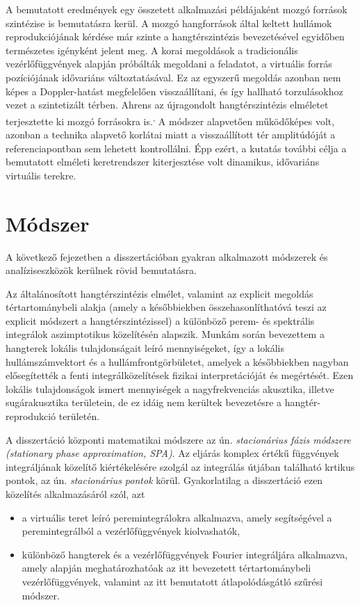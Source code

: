 \documentclass[10pt,twoside]{article}
\theoremstyle{thesisgroupstyle}
\theoremstyle{indented}
\begin{document}
A bemutatott eredmények egy összetett alkalmazási példájaként mozgó források szintézise is bemutatásra kerül.
A mozgó hangforrások által keltett hullámok reprodukciójának kérdése már szinte a hangtérszintézis bevezetésével egyidőben természetes igényként jelent meg.
A korai megoldások a tradicionális vezérlőfüggvények alapján próbálták megoldani a feladatot, a virtuális forrás pozíciójának idővariáns változtatásával.
Ez az egyszerű megoldás azonban nem képes a Doppler-hatást megfelelően visszaállítani, és így hallható torzulásokhoz vezet a szintetizált térben.
Ahrens az újragondolt hangtérszintézis elméletet terjesztette ki mozgó forrásokra is.\textsuperscript{,}
A módszer alapvetően működőképes volt, azonban a technika alapvető korlátai miatt a visszaállított tér amplitúdóját a referenciapontban sem lehetett kontrollálni.
Épp ezért, a kutatás további célja a bemutatott elméleti keretrendszer kiterjesztése volt dinamikus, idővariáns virtuális terekre.

\section{Módszer}

A következő fejezetben a disszertációban gyakran alkalmazott módszerek és analíziseszközök kerülnek rövid bemutatásra.

Az általánosított hangtérszintézis elmélet, valamint az explicit megoldás tértartománybeli alakja (amely a későbbiekben összehasonlíthatóvá teszi az explicit módszert a hangtérszintézissel) a különböző perem- és spektrális integrálok aszimptotikus közelítésén alapszik.
Munkám során bevezettem a hangterek lokális tulajdonságait leíró mennyiségeket, így a lokális hullámszámvektort és a hullámfrontgörbületet, amelyek a későbbiekben nagyban elősegítették a fenti integrálközelítések fizikai interpretációját és megértését.
Ezen lokális tulajdonságok ismert mennyiségek a nagyfrekvenciás akusztika, illetve sugárakusztika területein, de ez idáig nem kerültek bevezetésre a hangtér-reprodukció területén.

A disszertáció központi matematikai módszere az ún. \emph{stacionárius fázis módszere (stationary phase approximation, SPA)}.
Az eljárás komplex értékű függvények integráljának közelítő kiértékelésére szolgál az integrálás útjában található krtikus pontok, az ún. \emph{stacionárius pontok} körül.
Gyakorlatilag a disszertáció ezen közelítés alkalmazásáról szól, azt 
\begin{itemize}
\item a virtuális teret leíró peremintegrálokra alkalmazva, amely segítségével a peremintegrálból a vezérlőfüggvények kiolvashatók,
\item különböző hangterek és a vezérlőfüggvények Fourier integráljára alkalmazva, amely alapján meghatározhatóak az itt bevezetett tértartománybeli vezérlőfüggvények, valamint az itt bemutatott átlapolódásgátló szűrési módszer.
\end{itemize}
\end{document}
